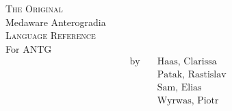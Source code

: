 \vspace*{\fill}
\begin{center}
{\LARGE\textsc{The Original}}
	\\[5mm]
	{\Huge Medaware Anterogradia\texttrademark}\\[5mm]
	{\LARGE\textsc{Language Reference}} \\[10mm]
	\large For ANTG \antgversion \\[2.5mm]
	\normalsize
	\begin{align*}
		\text{by}    \quad    &\text{Haas, Clarissa} \\
		&\text{Patak, Rastislav} \\
		&\text{Sam, Elias} \\
		&\text{Wyrwas, Piotr}
	\end{align*} \\[2.5mm]
\end{center}
\vspace*{\fill}
\newpage
